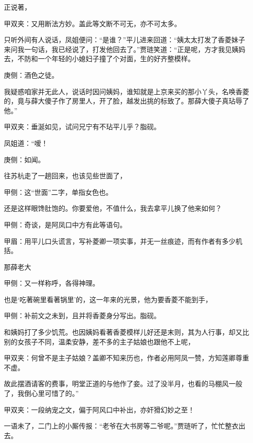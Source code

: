 \begin{parag}
    正说著，\begin{note}甲双夹：又用断法方妙。盖此等文断不可无，亦不可太多。\end{note}只听外间有人说话，凤姐便问：“是谁？”平儿进来回道：“姨太太打发了香菱妹子来问我一句话，我已经说了，打发他回去了。”贾琏笑道：“正是呢，方才我见姨妈去，不防和一个年轻的小媳妇子撞了个对面，生的好齐整模样。\begin{note}庚侧：酒色之徒。\end{note}我疑惑咱家并无此人，说话时因问姨妈，谁知就是上京来买的那小丫头，名唤香菱的，竟与薛大傻子作了房里人，开了脸，越发出挑的标致了。那薛大傻子真玷辱了他。”\begin{note}甲双夹：垂涎如见，试问兄宁有不玷平儿乎？脂砚。\end{note}凤姐道：“嗳！\begin{note}庚侧：如闻。\end{note}往苏杭走了一趟回来，也该见些世面了，\begin{note}甲侧：这“世面”二字，单指女色也。\end{note}还是这样眼馋肚饱的。你要爱他，不值什么，我去拿平儿换了他来如何？\begin{note}甲侧：奇谈，是阿凤口中方有此等语句。\end{note}\begin{note}甲眉：用平儿口头谎言，写补菱卿一项实事，并无一丝痕迹，而有作者有多少机括。\end{note}那薛老大\begin{note}甲侧：又一样称呼，各得神理。\end{note}也是‘吃著碗里看著锅里’的，这一年来的光景，他为要香菱不能到手，\begin{note}甲侧：补前文之未到，且并将香菱身分写出。脂砚。\end{note}和姨妈打了多少饥荒。也因姨妈看著香菱模样儿好还是末则，其为人行事，却又比别的女孩子不同，温柔安静，差不多的主子姑娘也跟他不上呢，\begin{note}甲双夹：何曾不是主子姑娘？盖卿不知来历也，作者必用阿凤一赞，方知莲卿尊重不虚。\end{note}故此摆酒请客的费事，明堂正道的与他作了妾。过了没半月，也看的马棚风一般了，我倒心里可惜了的。”\begin{note}甲双夹：一段纳宠之文，偏于阿风口中补出，亦奸猾幻妙之至！\end{note}一语未了，二门上的小厮传报：“老爷在大书房等二爷呢。”贾琏听了，忙忙整衣出去。
\end{parag}


